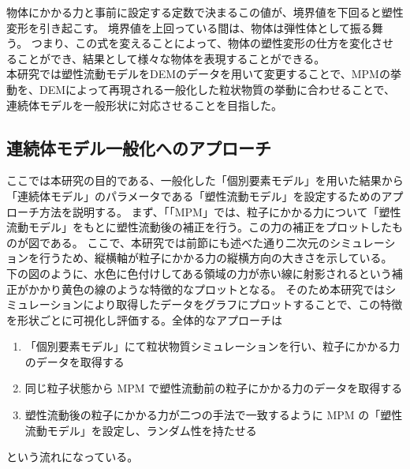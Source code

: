 \documentclass[12pt]{ltjsarticle}
\begin{document}
物体にかかる力と事前に設定する定数で決まるこの値が、境界値を下回ると塑性変形を引き起こす。
境界値を上回っている間は、物体は弾性体として振る舞う。
つまり、この式を変えることによって、物体の塑性変形の仕方を変化させることができ、結果として様々な物体を表現することができる。\\
本研究では塑性流動モデルをDEMのデータを用いて変更することで、MPMの挙動を、DEMによって再現される一般化した粒状物質の挙動に合わせることで、
連続体モデルを一般形状に対応させることを目指した。

\newpage

\subsection{連続体モデル一般化へのアプローチ}
ここでは本研究の目的である、一般化した「個別要素モデル」を用いた結果から「連続体モデル」のパラメータである「塑性流動モデル」を設定するためのアプローチ方法を説明する。
まず、「「MPM」では、粒子にかかる力について「塑性流動モデル」をもとに塑性流動後の補正を行う。この力の補正をプロットしたものが図である。
ここで、本研究では前節にも述べた通り二次元のシミュレーションを行うため、縦横軸が粒子にかかる力の縦横方向の大きさを示している。
下の図のように、水色に色付けしてある領域の力が赤い線に射影されるという補正がかかり黄色の線のような特徴的なプロットとなる。
そのため本研究ではシミュレーションにより取得したデータをグラフにプロットすることで、この特徴を形状ごとに可視化し評価する。全体的なアプローチは
\begin{enumerate}
\item「個別要素モデル」にて粒状物質シミュレーションを行い、粒子にかかる力のデータを取得する
\item 同じ粒子状態から MPM で塑性流動前の粒子にかかる力のデータを取得する
\item 塑性流動後の粒子にかかる力が二つの手法で一致するように MPM の「塑性流動モデル」を設定し、ランダム性を持たせる
\end{enumerate}
という流れになっている。
\end{document}
